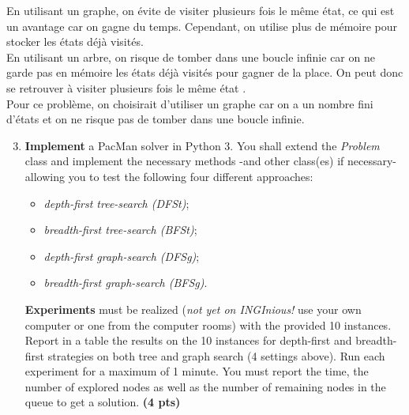 \documentclass[11pt,a4paper]{../template/report}
\begin{document}
\begin{answers}[4cm]
En utilisant un graphe, on évite de visiter plusieurs fois le même état, ce qui est un avantage car on gagne du temps. Cependant, on utilise plus de mémoire pour stocker les états déjà visités. \\
En utilisant un arbre, on risque de tomber dans une boucle infinie car on ne garde pas en mémoire les états déjà visités pour gagner de la place. On peut donc se retrouver à visiter plusieurs fois le même état . \\
Pour ce problème, on choisirait d'utiliser un graphe car on a un nombre fini d'états et on ne risque pas de tomber dans une boucle infinie.
\end{answers}



\begin{enumerate}
\setcounter{enumi}{2}
    \item \textbf{Implement} a PacMan solver in Python 3.
			You shall extend the \emph{Problem} class and implement the necessary methods -and other class(es) if necessary- allowing you to test the following four different approaches: 
			\begin{itemize}
			\item \textit{depth-first tree-search (DFSt)};
			\item \textit{breadth-first tree-search (BFSt)};
			\item \textit{depth-first graph-search (DFSg)};
			\item \textit{breadth-first graph-search (BFSg)}. 
			\end{itemize}

    \textbf{Experiments} must be realized (\textit{not yet on INGInious!} use your own computer or one from the computer rooms) with the provided 10 instances. Report in a table the results on the 10 instances for depth-first and breadth-first strategies on both tree and graph search (4 settings above). Run each experiment for a maximum of 1 minute. You must report the time, the number of explored nodes as well as the number of remaining nodes in the queue to get a solution. \textbf{(4 pts)}
\end{enumerate}
\end{document}
